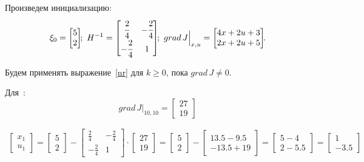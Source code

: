 Произведем инициализацию:
\begin{align*}
	\xi_0 =
	\begin{bmatrix}
		5 \\ 2
	\end{bmatrix}\!\!;~
	H^{-1} =
	\begin{bmatrix}
		\cfrac{2}{4} & -\cfrac{2}{4} \\
		-\cfrac{2}{4} & 1
	\end{bmatrix}\!\!;~
	grad\,J \Big|_{x,u}= 
	\begin{bmatrix}
	4 x + 2 u + 3 \\
	2 x + 2 u + 5
	\end{bmatrix}\!\!.
\end{align*}

Будем применять выражение~\eqref{nr} для $k \ge 0$, пока $grad\,J \ne 0$. 

Для \,:
\begin{equation}
	grad\,J \Big|_{10, 10}	
	= 
	\begin{bmatrix}
		27 \\ 19
	\end{bmatrix}
\end{equation}

\begin{align*}
	\begin{bmatrix}
		x_{1} \\ u_{1}
	\end{bmatrix}
	=
	\begin{bmatrix}
		5 \\ 2
	\end{bmatrix}
	-
	\textstyle
	\begin{bmatrix}
		\frac{2}{4} & -\frac{2}{4} \\
		-\frac{2}{4} & 1
	\end{bmatrix}
	\cdot
	\begin{bmatrix}
		27 \\ 19
	\end{bmatrix}
	=
	\begin{bmatrix}
		5 \\ 2
	\end{bmatrix}
	-
	\begin{bmatrix}
		13.5-9.5 \\ -13.5 + 19
	\end{bmatrix}
	= 
	\begin{bmatrix}
		5 - 4 \\ 2 - 5.5
	\end{bmatrix}
	= 
	\begin{bmatrix}
		1 \\ -3.5
	\end{bmatrix}	
\end{align*}

